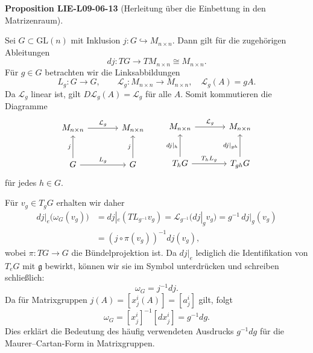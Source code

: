 \documentclass[10pt, letterpaper]{article}
\newcommand{\GL}{\mathrm{GL}}
\newcommand{\CustomHeading}[3]{%
  \par\medskip\noindent%
  \textbf{#1 #2} \textnormal{(#3)}.\enskip%
}
\newenvironment{PROP}[2]{\CustomHeading{Proposition}{#1}{#2}}{}
\begin{document}
\begin{PROP}{LIE-L09-06-13}{Herleitung über die Einbettung in den Matrizenraum}
Sei $G\subset\GL(n)$ mit Inklusion $j:G\hookrightarrow M_{n\times n}$.
Dann gilt für die zugehörigen Ableitungen
\[
dj:T G\longrightarrow T M_{n\times n}\cong M_{n\times n}.
\]
Für $g\in G$ betrachten wir die Linksabbildungen
\[
L_g:G\to G,\qquad \mathcal L_g:M_{n\times n}\to M_{n\times n},
\quad \mathcal L_g(A)=gA.
\]
Da $\mathcal L_g$ linear ist, gilt $D\mathcal L_g(A)=\mathcal L_g$ für alle $A$.
Somit kommutieren die Diagramme
\[
\begin{tikzcd}[row sep=large, column sep=large]
M_{n\times n}\arrow[r,"\mathcal L_g"] & M_{n\times n}\\
G\arrow[u,"j"]\arrow[r,"L_g"] & G\arrow[u,"j"]
\end{tikzcd}
\qquad
\begin{tikzcd}[row sep=large, column sep=large]
M_{n\times n}\arrow[r,"\mathcal L_g"] & M_{n\times n}\\
T_hG\arrow[u,"dj|_h"]\arrow[r,"T_hL_g"] & T_{gh}G\arrow[u,"dj|_{gh}"]
\end{tikzcd}
\]
für jedes $h\in G$.

Für $v_g\in T_gG$ erhalten wir daher
\[
\begin{aligned}
dj|_e\bigl(\omega_G(v_g)\bigr)
&=dj|_e(T L_{g^{-1}}v_g)
=\mathcal L_{g^{-1}}(dj|_g v_g)
=g^{-1}\,dj|_g(v_g)\\
&=(j\circ\pi(v_g))^{-1}dj(v_g),
\end{aligned}
\]
wobei $\pi:T G\to G$ die Bündelprojektion ist.  
Da $dj|_e$ lediglich die Identifikation von $T_eG$ mit $\mathfrak g$
bewirkt, können wir sie im Symbol unterdrücken und schreiben schließlich:
\[
\boxed{\;\omega_G = j^{-1}dj.\;}
\]
Da für Matrixgruppen $j(A)=[x^i_j(A)]=[a^i_j]$ gilt, folgt
\[
\omega_G = [x^i_j]^{-1}[dx^i_j]
= g^{-1}dg.
\]
Dies erklärt die Bedeutung des häufig verwendeten Ausdrucks
$g^{-1}dg$ für die Maurer--Cartan-Form in Matrixgruppen.
\end{PROP}
\end{document}
